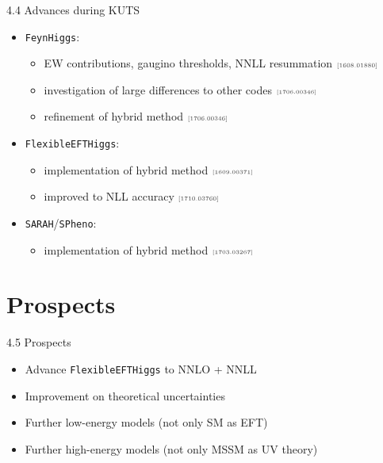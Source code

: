 \documentclass[hyperref={pdfpagelabels=false},ngerman]{beamer}
\newcommand{\mycite}[1]{\ensuremath{\text{\textcolor{darkgray}{\tiny [#1]}}}}
\newcommand{\feft}{\texttt{FlexibleEFTHiggs}\xspace}
\newcommand{\FH}{\texttt{FeynHiggs}\xspace}
\newcommand{\SPheno}{\texttt{SPheno}\xspace}
\newcommand{\SARAH}{\texttt{SARAH}\xspace}
\begin{document}
\begin{frame}{4.4 Advances during KUTS}
  \begin{itemize}
  \item \FH:
    \begin{itemize}
    \item EW contributions, gaugino thresholds, NNLL resummation \mycite{1608.01880}
    \item investigation of large differences to other codes \mycite{1706.00346}
    \item refinement of hybrid method \mycite{1706.00346}
  \end{itemize}
  \item \feft:
    \begin{itemize}
    \item implementation of hybrid method \mycite{1609.00371}
    \item improved to NLL accuracy \mycite{1710.03760}
  \end{itemize}
  \item \SARAH/\SPheno:
    \begin{itemize}
    \item implementation of hybrid method \mycite{1703.03267}
    \end{itemize}
  \end{itemize}
\end{frame}

\section{Prospects}

\begin{frame}{4.5 Prospects}
  \begin{itemize}
  \item Advance \feft to NNLO + NNLL
  \item Improvement on theoretical uncertainties
  \item Further low-energy models (not only SM as EFT)
  \item Further high-energy models (not only MSSM as UV theory)
  \end{itemize}
\end{frame}
\end{document}
